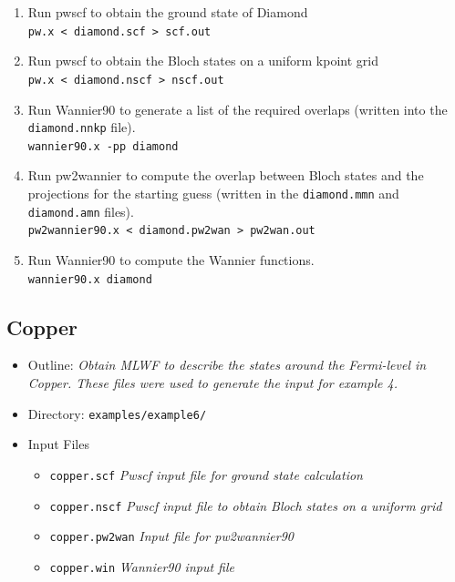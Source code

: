 \documentclass[a4paper,11pt,twoside]{article}
\begin{document}
\begin{enumerate}
\item Run pwscf to obtain the ground state of Diamond\\
{\tt pw.x < diamond.scf > scf.out}

\item Run pwscf to obtain the Bloch states on a uniform kpoint grid\\
{\tt pw.x < diamond.nscf > nscf.out}

\item Run Wannier90 to generate a list of the required overlaps (written
  into the {\tt diamond.nnkp} file).\\ 
{\tt wannier90.x -pp diamond}

\item Run pw2wannier to compute the overlap between Bloch states and the
  projections for the starting guess (written in the {\tt diamond.mmn} and {\tt diamond.amn} files).\\ 
{\tt pw2wannier90.x < diamond.pw2wan > pw2wan.out}

\item Run Wannier90 to compute the Wannier functions.\\
{\tt wannier90.x diamond}

\end{enumerate}

\subsection*{Copper}
\begin{itemize}
\item{Outline: \it{Obtain MLWF to describe the states around the Fermi-level in Copper. These files were used
to generate the input for example 4.}}
\item{Directory: {\tt examples/example6/}}
\item{Input Files}
\begin{itemize}
\item{ {\tt copper.scf}  {\it Pwscf input file for ground state calculation}}
\item{ {\tt copper.nscf}  {\it Pwscf input file to obtain Bloch states on a uniform grid}}
\item{ {\tt copper.pw2wan}  {\it Input file for pw2wannier90}}
\item{ {\tt copper.win}  {\it Wannier90 input file}}
\end{itemize}
                                                                                                                                            
\end{itemize}
\end{document}
